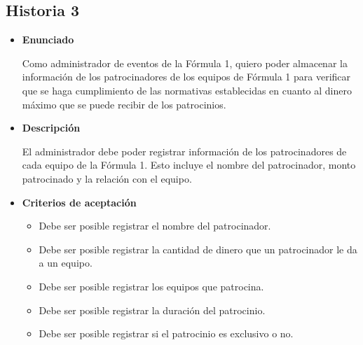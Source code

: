 \documentclass{article}
\begin{document}
	\subsection{Historia 3}
	\begin{itemize}
		
		\item \large{\textbf{Enunciado}}
		\begin{description}
			Como administrador de eventos de la Fórmula 1, quiero poder almacenar la información de los patrocinadores de los equipos de Fórmula 1 para verificar que se haga cumplimiento de las normativas establecidas en cuanto al dinero máximo que se puede recibir de los patrocinios.
			
		\end{description}
		
		\item \large{\textbf{Descripción}}
		\begin{description}
			El administrador debe poder registrar información de los patrocinadores de cada equipo de la Fórmula 1. Esto incluye el nombre del patrocinador, monto patrocinado y la relación con el equipo.

		\end{description}
		
		\item \large{\textbf{Criterios de aceptación}}
		\begin{itemize}
			\item Debe ser posible registrar el nombre del patrocinador.
			
			\item Debe ser posible registrar la cantidad de dinero que un patrocinador le da a un equipo.
			
			\item Debe ser posible registrar los equipos que patrocina.
			
			\item Debe ser posible registrar la duración del patrocinio.
			
			\item Debe ser posible registrar si el patrocinio es exclusivo o no.
			
		\end{itemize}
		
	\end{itemize}
	
\end{document}
